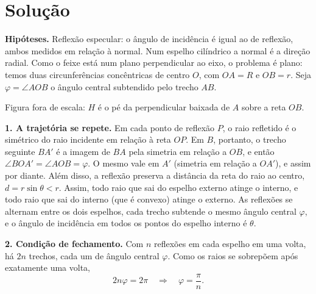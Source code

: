 \documentclass{article}%
\begin{document}
\section*{Solução}

\textbf{Hipóteses.} Reflexão especular: o ângulo de incidência é igual ao de reflexão, ambos medidos em relação à normal. Num espelho cilíndrico a normal é a direção radial. Como o feixe está num plano perpendicular ao eixo, o problema é plano: temos duas circunferências concêntricas de centro $O$, com $OA=R$ e $OB=r$. Seja $\varphi=\angle AOB$ o ângulo central subtendido pelo trecho $AB$.

\begin{center}

{\small Figura fora de escala: $H$ é o pé da perpendicular baixada de $A$ sobre a reta $OB$.}
\end{center}

\textbf{1. A trajetória se repete.} Em cada ponto de reflexão $P$, o raio refletido é o simétrico do raio incidente em relação à reta $OP$. Em $B$, portanto, o trecho seguinte $BA'$ é a imagem de $BA$ pela simetria em relação a $OB$, e então $\angle BOA'=\angle AOB=\varphi$. O mesmo vale em $A'$ (simetria em relação a $OA'$), e assim por diante. Além disso, a reflexão preserva a distância da reta do raio ao centro, $d=r\sin\theta<r$. Assim, todo raio que sai do espelho externo atinge o interno, e todo raio que sai do interno (que é convexo) atinge o externo. As reflexões se alternam entre os dois espelhos, cada trecho subtende o mesmo ângulo central $\varphi$, e o ângulo de incidência em todos os pontos do espelho interno é $\theta$.

\textbf{2. Condição de fechamento.} Com $n$ reflexões em cada espelho em uma volta, há $2n$ trechos, cada um de ângulo central $\varphi$. Como os raios se sobrepõem após exatamente uma volta,
\[
2n\varphi=2\pi\quad\Longrightarrow\quad \varphi=\frac{\pi}{n}.
\]
\end{document}
